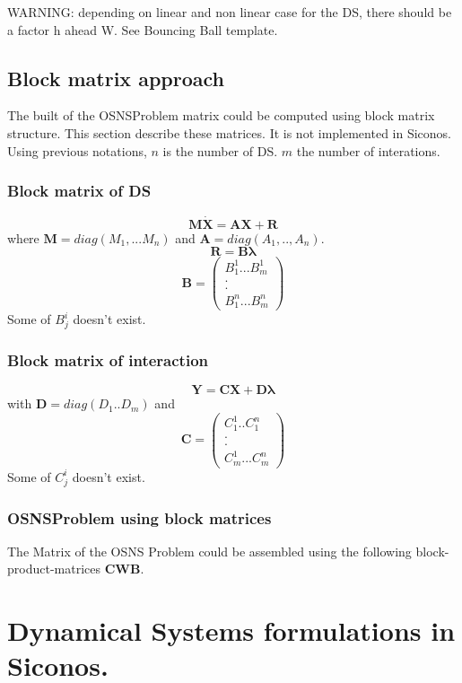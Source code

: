 \documentclass[10pt]{report}
\begin{document}
WARNING: depending on linear and non linear case for the DS, there should be a factor h ahead W. See Bouncing Ball template.
\section{Block matrix approach}
The built of the OSNSProblem matrix could be computed using block
matrix structure. This section describe these matrices. It is not
implemented in Siconos.
Using previous notations, $n$ is the number of DS. $m$ the number of
interations.

\subsection{Block matrix of DS}
\[\boldsymbol{M}  \boldsymbol{\dot X}=\boldsymbol{A} \boldsymbol{X} + \boldsymbol{R}\]
where $\boldsymbol{M}=diag(M_1,...M_n)$ and
$\boldsymbol{A}=diag(A_1,..,A_n)$.
\[\boldsymbol{R}=\boldsymbol{B}\boldsymbol{\lambda}\]
\[\boldsymbol{B}=\left( \begin{array} {c} B^1_{1}...B^1_m\\.\\.\\
    B^n_1...B^n_m  \end{array}\right)\]
Some of $B^i_j$ doesn't exist.
\subsection{Block matrix of interaction}
\[ \boldsymbol{Y}= \boldsymbol{C}  \boldsymbol{X}+
\boldsymbol{D} \boldsymbol{\lambda}\]
with $ \boldsymbol{D}=diag(D_1..D_m)$ and
\[ \boldsymbol{C}=\left( \begin{array} {c}
    C^1_{1}..C^n_1\\.\\.\\C^1_{m}...C^n_{m} \end{array}\right)\]
Some of $C^i_j$ doesn't exist.

\subsection{OSNSProblem using block matrices}
The Matrix of the OSNS Problem could be assembled using the following
block-product-matrices $\boldsymbol{C}\boldsymbol{W}\boldsymbol{B}$.
\chapter{Dynamical Systems formulations in Siconos.}
\end{document}
